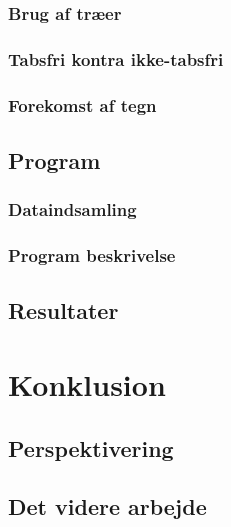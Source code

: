 \documentclass[12pt,a4paper]{report}
\begin{document}
	\subsection{Brug af træer}
	   
   
	\subsection{Tabsfri kontra ikke-tabsfri}
    \label{tkitf}
	

	\subsection{Forekomst af tegn}
    \label{tegnForekomst}
	

   \section{Program}

	\subsection{Dataindsamling}
	
   
%   	
   	
   	\subsection{Program beskrivelse}
   	
   	
   	\section{Resultater}
    \label{resultater}
   	

\chapter{Konklusion}

           

           \section{Perspektivering}
	

           \section{Det videre arbejde}
	





\end{document}
